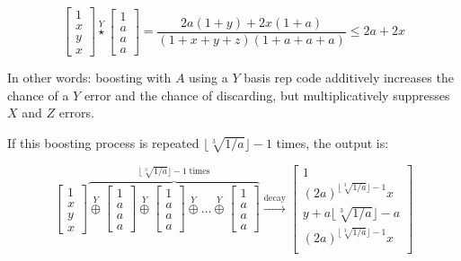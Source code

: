 \documentclass[onecolumn,unpublished,a4paper]{quantumarticle}
\theoremstyle{definition}
\theoremstyle{definition}
\theoremstyle{definition}
\begin{document}
\begin{equation}
\begin{bmatrix}1\\x\\y\\x\end{bmatrix}
\stackrel{Y}{\star}
\begin{bmatrix}1\\a\\a\\a\end{bmatrix}
=\frac{2a(1 + y) + 2x(1 + a)}{(1+x+y+z)(1+a+a+a)}
\leq
2a + 2x
\end{equation}

In other words: boosting with $A$ using a $Y$ basis rep code additively increases the chance of a $Y$ error and the chance of discarding, but multiplicatively suppresses $X$ and $Z$ errors.

If this boosting process is repeated $\lfloor \sqrt[3]{1/a} \rfloor-1$ times, the output is:

\begin{equation}
\begin{bmatrix}1\\x\\y\\x\end{bmatrix}
\overbrace{
\stackrel{Y}{\oplus}
\begin{bmatrix}1\\a\\a\\a\end{bmatrix}
\stackrel{Y}{\oplus}
\begin{bmatrix}1\\a\\a\\a\end{bmatrix}
\stackrel{Y}{\oplus}
\dots
\stackrel{Y}{\oplus}
\begin{bmatrix}1\\a\\a\\a\end{bmatrix}
}^{\lfloor \sqrt[3]{1/a} \rfloor - 1\;\text{times}}
\xrightarrow{\text{decay}}\begin{bmatrix}
1\\
(2a)^{\lfloor \sqrt[3]{1/a} \rfloor - 1} x\\
y + a\lfloor \sqrt[3]{1/a} \rfloor - a\\
(2a)^{\lfloor \sqrt[3]{1/a} \rfloor - 1} x\\
\end{bmatrix}
\end{equation}
\end{document}

